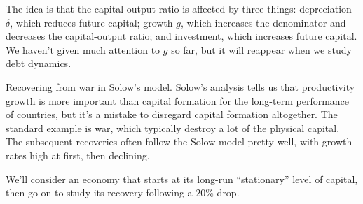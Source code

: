\documentclass[12pt]{exam}
\begin{document}
\begin{questions}
\begin{solution}
\begin{parts}
The idea is that the capital-output ratio is affected by three things:
depreciation $\delta$, which reduces future capital; growth $g$,
which increases the denominator and decreases the capital-output ratio;
and investment, which increases future capital.
We haven't given much attention to $g$ so far,
but it will reappear when we study debt dynamics.

\end{parts}
\end{solution}

\question Recovering from war in Solow's model.
Solow's analysis tells us that productivity growth
is more important than capital formation for the long-term
performance of countries,
but it's a mistake to disregard capital formation altogether.
The standard example is war,
which typically destroy a lot of the physical capital.
The subsequent recoveries often follow the Solow model pretty well,
with growth rates high at first, then declining.

We'll consider an economy that starts at its long-run
``stationary'' level of capital, then go on
to study its recovery following a 20\% drop.
%

\begin{solution}
\begin{parts}

\end{parts}
\end{solution}
\end{questions}
\end{document}
